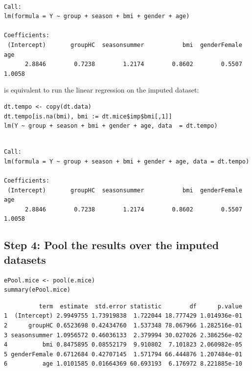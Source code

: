 \documentclass[12pt]{article}
\begin{document}
\begin{verbatim}

Call:
lm(formula = Y ~ group + season + bmi + gender + age)

Coefficients:
 (Intercept)       groupHC  seasonsummer           bmi  genderFemale           age  
      2.8846        0.7238        1.2174        0.8602        0.5507        1.0058
\end{verbatim}

is equivalent to run the linear regression on the imputed dataset:
\lstset{language=r,label= ,caption= ,captionpos=b,numbers=none}
\begin{lstlisting}
dt.tempo <- copy(dt.data)
dt.tempo[is.na(bmi), bmi := dt.mice$imp$bmi[,1]]
lm(Y ~ group + season + bmi + gender + age, data  = dt.tempo)
\end{lstlisting}

\begin{verbatim}

Call:
lm(formula = Y ~ group + season + bmi + gender + age, data = dt.tempo)

Coefficients:
 (Intercept)       groupHC  seasonsummer           bmi  genderFemale           age  
      2.8846        0.7238        1.2174        0.8602        0.5507        1.0058
\end{verbatim}

\clearpage

\subsection{Step 4: Pool the results over the imputed datasets}
\label{sec:org8fdcc02}

\lstset{language=r,label= ,caption= ,captionpos=b,numbers=none}
\begin{lstlisting}
ePool.mice <- pool(e.mice)
summary(ePool.mice)
\end{lstlisting}

\begin{verbatim}
          term  estimate  std.error statistic        df      p.value
1  (Intercept) 2.9949755 1.73919838  1.722044 18.777429 1.014936e-01
2      groupHC 0.6523698 0.42434760  1.537348 78.067966 1.282516e-01
3 seasonsummer 1.0956572 0.46036133  2.379994 30.027026 2.386256e-02
4          bmi 0.8475895 0.08552179  9.910802  7.101823 2.060982e-05
5 genderFemale 0.6712684 0.42707145  1.571794 66.444876 1.207484e-01
6          age 1.0101585 0.01664369 60.693193  6.176972 8.221885e-10
\end{verbatim}
\end{document}
